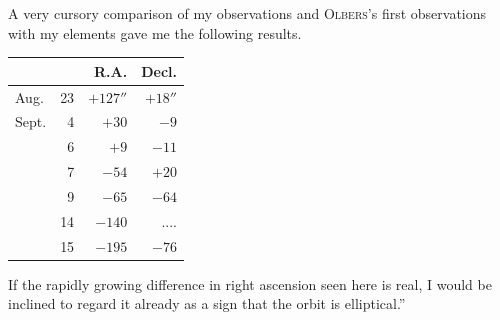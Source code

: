 \par\indent A very cursory comparison of my observations and \textsc{Olbers}’s first observations with my elements gave me the following results.
\begin{center}\fontsize{10}{12}\selectfont\setlength{\tabcolsep}{7pt}\renewcommand{\arraystretch}{1.15}\begin{tabular}{lr|r|r}
 & & R.A. & Decl.\\\hline
Aug. & 23 & $+127''$ & $+18''$\\
Sept. & 4 & $+30$ & $-9$\\
 & 6 & $+9$ & $-11$\\
 & 7 & $-54$ & $+20$\\
 & 9 & $-65$ & $-64$\\
 & 14 & $-140$ & .\;.\;.\;.\\
 & 15 & $-195$ & $-76$\\
\end{tabular}\end{center}

\par\indent If the rapidly growing difference in right ascension seen here is real, I would be inclined to regard it already as a sign that the orbit is elliptical.”
